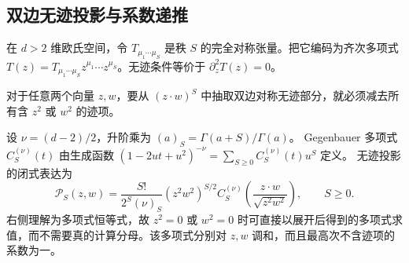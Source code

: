 \subsection{双边无迹投影与系数递推}

\begin{definition}[对称张量的极化编码]
在 $d>2$ 维欧氏空间，令 $T_{\mu_1\cdots\mu_S}$ 是秩 $S$ 的完全对称张量。把它编码为齐次多项式 $T(z)=T_{\mu_1\cdots\mu_S}z^{\mu_1}\cdots z^{\mu_S}$。无迹条件等价于 $\partial_z^2T(z)=0$。

对于任意两个向量 $z,w$，要从 $(z\cdot w)^S$ 中抽取双边对称无迹部分，就必须减去所有含 $z^2$ 或 $w^2$ 的迹项。
\end{definition}

\begin{theorem}[对称无迹张量的投影多项式]
设 $\nu=(d-2)/2$，升阶乘为 $(a)_S=\Gamma(a+S)/\Gamma(a)$。
Gegenbauer 多项式 $C_S^{(\nu)}(t)$ 由生成函数
$(1-2ut+u^2)^{-\nu}=\sum_{S\geq0}C_S^{(\nu)}(t)u^S$ 定义。
无迹投影的闭式表达为
\begin{equation}\label{eq:ghs-r4-stf-projector}
 \mathcal P_S(z,w)=\frac{S!}{2^S(\nu)_S}
 (z^2w^2)^{S/2}
 C_S^{(\nu)}\!\left(\frac{z\cdot w}{\sqrt{z^2w^2}}\right),
 \qquad S\ge0.
\end{equation}
右侧理解为多项式恒等式，故 $z^2=0$ 或 $w^2=0$ 时可直接以展开后得到的多项式求值，而不需要真的计算分母。该多项式分别对 $z,w$ 调和，而且最高次不含迹项的系数为一。
\end{theorem}
